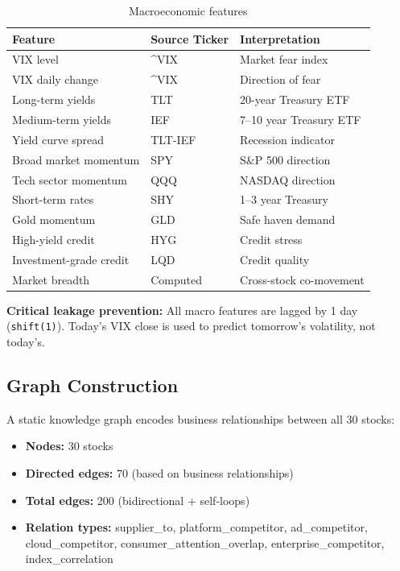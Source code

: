 \documentclass[12pt,a4paper]{article}
\begin{document}
\begin{table}[H]
\centering
\caption{Macroeconomic features}
\begin{tabular}{lll}
\toprule
\textbf{Feature} & \textbf{Source Ticker} & \textbf{Interpretation} \\
\midrule
VIX level        & \^{}VIX  & Market fear index \\
VIX daily change & \^{}VIX  & Direction of fear \\
Long-term yields & TLT      & 20-year Treasury ETF \\
Medium-term yields & IEF    & 7--10 year Treasury ETF \\
Yield curve spread & TLT-IEF & Recession indicator \\
Broad market momentum & SPY & S\&P 500 direction \\
Tech sector momentum  & QQQ & NASDAQ direction \\
Short-term rates  & SHY     & 1--3 year Treasury \\
Gold momentum    & GLD      & Safe haven demand \\
High-yield credit & HYG    & Credit stress \\
Investment-grade credit & LQD & Credit quality \\
Market breadth   & Computed & Cross-stock co-movement \\
\bottomrule
\end{tabular}
\end{table}

\textbf{Critical leakage prevention:} All macro features are lagged by 1 day (\texttt{shift(1)}). Today's VIX close is used to predict tomorrow's volatility, not today's.

\subsection{Graph Construction}

A static knowledge graph encodes business relationships between all 30 stocks:

\begin{itemize}[noitemsep]
    \item \textbf{Nodes:} 30 stocks
    \item \textbf{Directed edges:} 70 (based on business relationships)
    \item \textbf{Total edges:} 200 (bidirectional + self-loops)
    \item \textbf{Relation types:} supplier\_to, platform\_competitor, ad\_competitor, cloud\_competitor, consumer\_attention\_overlap, enterprise\_competitor, index\_correlation
\end{itemize}
\end{document}
